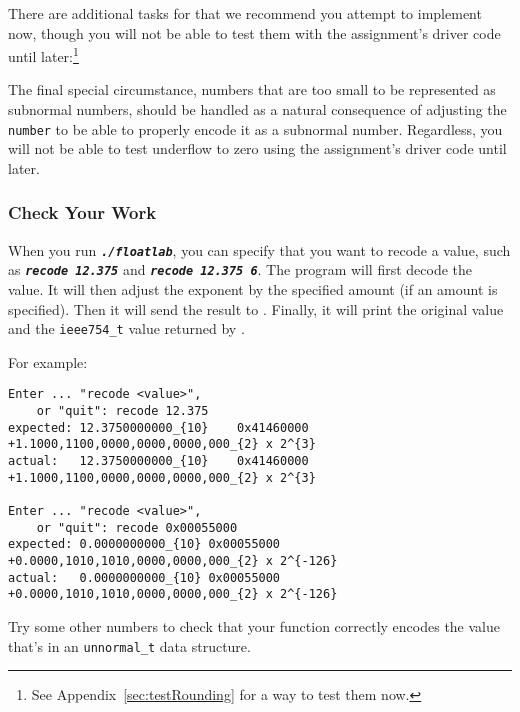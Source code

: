 There are additional tasks for  that we recommend you attempt to implement now, though you will not be able to test them with the assignment's driver code until later:\footnote{See Appendix~\ref{sec:testRounding} for a way to test them now.}

\begin{description}
\end{description}

The final special circumstance, numbers that are too small to be represented as subnormal numbers,
should be handled as a natural consequence of adjusting the \lstinline{number} to be able to properly encode it as a subnormal number.
Regardless, you will not be able to test underflow to zero using the assignment's driver code until later.


\subsubsection*{Check Your Work}

When you run \texttt{\textbf{\textit{./floatlab}}}, you can specify that you want to recode a value, such as \texttt{\textbf{\textit{recode 12.375}}} and \texttt{\textbf{\textit{recode 12.375 6}}}.
The program will first decode the value.
It will then adjust the exponent by the specified amount (if an amount is specified).
Then it will send the result to .
Finally, it will print the original value and the \lstinline{ieee754_t} value returned by .

\begin{description}
\end{description}
For example:

\begin{verbatim}
Enter ... "recode <value>",
    or "quit": recode 12.375
expected: 12.3750000000_{10}	0x41460000	+1.1000,1100,0000,0000,0000,000_{2} x 2^{3}
actual:   12.3750000000_{10}	0x41460000	+1.1000,1100,0000,0000,0000,000_{2} x 2^{3}

Enter ... "recode <value>",
    or "quit": recode 0x00055000
expected: 0.0000000000_{10}	0x00055000	+0.0000,1010,1010,0000,0000,000_{2} x 2^{-126}
actual:   0.0000000000_{10}	0x00055000	+0.0000,1010,1010,0000,0000,000_{2} x 2^{-126}
\end{verbatim}

Try some other numbers to check that your  function correctly encodes the value that's in an \lstinline{unnormal_t} data structure.
